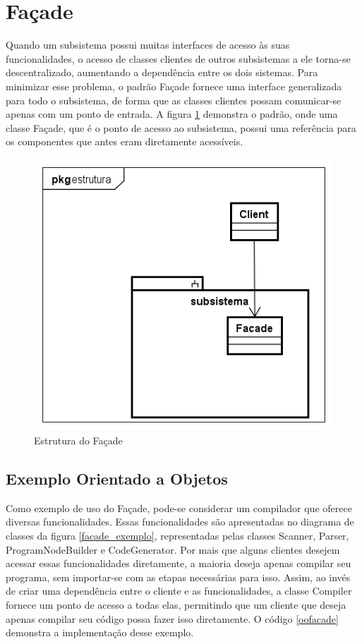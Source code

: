 \section{Façade}

Quando um subsistema possui muitas interfaces 
de acesso às suas funcionalidades, o acesso de 
classes clientes de outros subsistemas a ele 
torna-se descentralizado, aumentando a dependência 
entre os dois sistemas. Para minimizar esse problema, 
o padrão Façade fornece uma interface generalizada 
para todo o subsistema, de forma que as classes 
clientes possam comunicar-se apenas com um ponto 
de entrada. A figura \ref{facade_struct} demonstra 
o padrão, onde uma classe Façade, que é o ponto de 
acesso ao subsistema, possui uma referência para 
os componentes que antes eram diretamente acessíveis.\cite{gamma:1995}

\begin{figure}[htb]
	\caption{\label{facade_struct}Estrutura do Façade}
	\begin{center}
	    \includegraphics[scale=0.4]{5_padroes-contexto-funcional/5.2_estruturais/5.2.5_facade/facade_estrutura.png}
	\end{center}
\end{figure}

\subsection*{Exemplo Orientado a Objetos}

Como exemplo de uso do Façade, pode-se considerar 
um compilador que oferece diversas funcionalidades. 
Essas funcionalidades são apresentadas no diagrama 
de classes da figura \ref{facade_exemplo}, representadas 
pelas classes Scanner, Parser, ProgramNodeBuilder e 
CodeGenerator. Por mais que alguns clientes desejem 
acessar essas funcionalidades diretamente, a maioria 
deseja apenas compilar seu programa, sem importar-se 
com as etapas necessárias para isso. Assim, ao invés de 
criar uma dependência entre o cliente e as 
funcionalidades, a classe Compiler fornece um ponto 
de acesso a todas elas, permitindo que um cliente 
que deseja apenas compilar seu código possa fazer 
isso diretamente. O código \ref{oofacade} demonstra 
a implementação desse exemplo.

